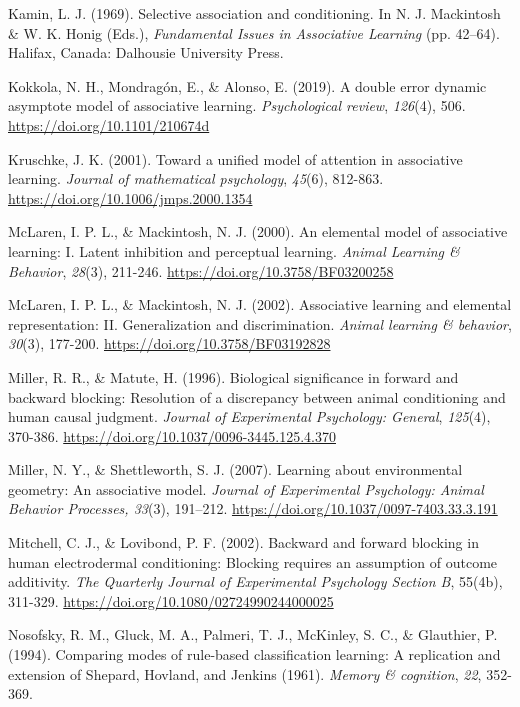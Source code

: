 \documentclass[twocolumn]{article}
\begin{document}
\begin{hangparas}{1em}{1}
Kamin, L. J. (1969). Selective association and conditioning. In N. J.
Mackintosh \& W. K. Honig (Eds.), \emph{Fundamental Issues in
Associative Learning} (pp. 42--64). Halifax, Canada: Dalhousie
University Press.

Kokkola, N. H., Mondragón, E., \& Alonso, E. (2019). A double error
dynamic asymptote model of associative learning. \emph{Psychological
review}, \emph{126}(4), 506. \url{https://doi.org/10.1101/210674d}

Kruschke, J. K. (2001). Toward a unified model of attention in
associative learning. \emph{Journal of mathematical psychology},
\emph{45}(6), 812-863. \url{https://doi.org/10.1006/jmps.2000.1354}

McLaren, I. P. L., \& Mackintosh, N. J. (2000). An elemental model of
associative learning: I. Latent inhibition and perceptual learning.
\emph{Animal Learning \& Behavior}, \emph{28}(3), 211-246.
\url{https://doi.org/10.3758/BF03200258}

McLaren, I. P. L., \& Mackintosh, N. J. (2002). Associative learning and
elemental representation: II. Generalization and discrimination.
\emph{Animal learning \& behavior}, \emph{30}(3), 177-200.
\url{https://doi.org/10.3758/BF03192828}

Miller, R. R., \& Matute, H. (1996). Biological significance in forward
and backward blocking: Resolution of a discrepancy between animal
conditioning and human causal judgment. \emph{Journal of Experimental
Psychology: General}, \emph{125}(4), 370-386.
\url{https://doi.org/10.1037/0096-3445.125.4.370}

Miller, N. Y., \& Shettleworth, S. J. (2007). Learning about
environmental geometry: An associative model. \emph{\emph{Journal of
Experimental Psychology: Animal Behavior Processes, 33}}(3), 191--212.
\href{https://doi.org/10.1037/0097-7403.33.3.191}{https://doi.org/}\href{https://doi.org/10.1037/0097-7403.33.3.191}{10.1037/0097-7403.33.3.191}

Mitchell, C. J., \& Lovibond, P. F. (2002). Backward and forward
blocking in human electrodermal conditioning: Blocking requires an
assumption of outcome additivity. \emph{The Quarterly Journal of
Experimental Psychology Section B}, 55(4b), 311-329.
\url{https://doi.org/10.1080/02724990244000025}


Nosofsky, R. M., Gluck, M. A., Palmeri, T. J., McKinley, S. C., \&
Glauthier, P. (1994). Comparing modes of rule-based classification
learning: A replication and extension of Shepard, Hovland, and Jenkins
(1961). \emph{Memory \& cognition}, \emph{22}, 352-369.


\end{hangparas}
\end{document}
